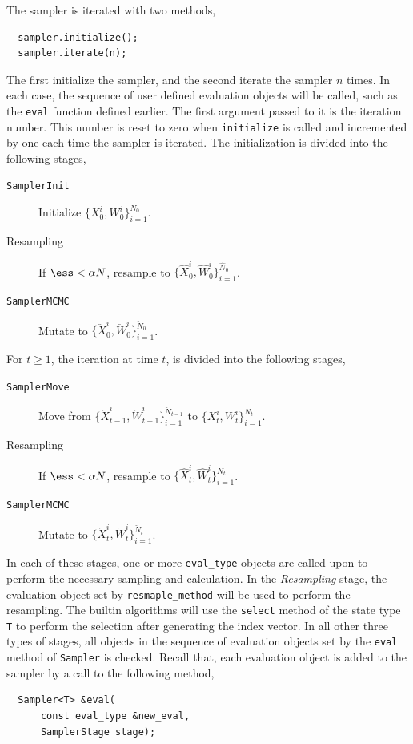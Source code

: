 The sampler is iterated with two methods,
\begin{Verbatim}
  sampler.initialize();
  sampler.iterate(n);
\end{Verbatim}
The first initialize the sampler, and the second iterate the sampler $n$ times.
In each case, the sequence of user defined evaluation objects will be called,
such as the \verb|eval| function defined earlier. The first argument passed to
it is the iteration number. This number is reset to zero when \verb|initialize|
is called and incremented by one each time the sampler is iterated. The
initialization is divided into the following stages,
\begin{description}
  \item[\texttt{SamplerInit}] Initialize $\{X_0^i,W_0^i\}_{i=1}^{N_0}$.
  \item[Resampling] If $\ess < \alpha N$, resample to
    $\{\hat{X}_0^i,\hat{W}_0^i\}_{i=1}^{\hat{N}_0}$.
  \item[\texttt{SamplerMCMC}] Mutate to
    $\{\check{X}_0^i,\check{W}_0^i\}_{i=1}^{\check{N}_0}$.
\end{description}
For $t\ge1$, the iteration at time $t$, is divided into the following stages,
\begin{description}
  \item[\texttt{SamplerMove}] Move from
    $\{\check{X}_{t-1}^i,\check{W}_{t-1}^i\}_{i=1}^{\check{N}_{t-1}}$ to
    $\{X_t^i,W_t^i\}_{i=1}^{N_t}$.
  \item[Resampling] If $\ess < \alpha N$, resample to
    $\{\hat{X}_t^i,\hat{W}_t^i\}_{i=1}^{\hat{N}_t}$.
  \item[\texttt{SamplerMCMC}] Mutate to
    $\{\check{X}_t^i,\check{W}_t^i\}_{i=1}^{\check{N}_t}$.
\end{description}
In each of these stages, one or more \verb|eval_type| objects are called upon
to perform the necessary sampling and calculation. In the \emph{Resampling}
stage, the evaluation object set by \verb|resmaple_method| will be used to
perform the resampling. The builtin algorithms will use the \verb|select|
method of the state type \verb|T| to perform the selection after generating the
index vector. In all other three types of stages, all objects in the sequence
of evaluation objects set by the \verb|eval| method of \verb|Sampler| is
checked. Recall that, each evaluation object is added to the sampler by a call
to the following method,
\begin{Verbatim}
  Sampler<T> &eval(
      const eval_type &new_eval,
      SamplerStage stage);
\end{Verbatim}
